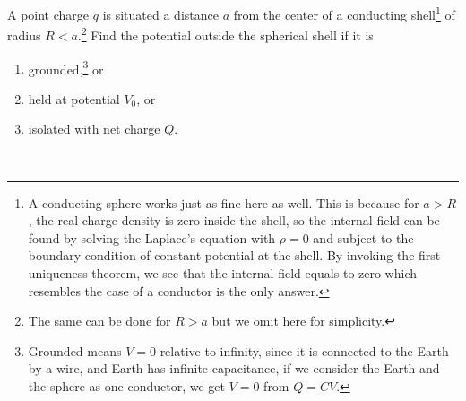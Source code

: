\documentclass[english,a4paper,12pt]{report}
\begin{document}
{A point charge \(q\) is situated a distance \(a\) from the center of a conducting shell\footnote{A conducting sphere works just as fine here as well. This is because for \(a > R\), the real charge density is zero inside the shell, so the internal field can be found by solving the Laplace's equation with \(\rho = 0\) and subject to the boundary condition of constant potential at the shell. By invoking the first uniqueness theorem, we see that the internal field equals to zero which resembles the case of a conductor is the only answer.} of radius \(R < a\).\footnote{The same can be done for \(R > a\) but we omit here for simplicity.} Find the potential outside the spherical shell if it is  
\newline 
\begin{enumerate}[itemsep=10pt] 
    \item grounded,\footnote{Grounded means \(V = 0 \) relative to infinity, since it is connected to the Earth by a wire, and Earth has infinite capacitance, if we consider the Earth and the sphere as one conductor, we get \(V = 0\) from \(Q = CV\).} or
    \item held at potential \(V_0\), or
    \item isolated with net charge \(Q\).
\end{enumerate}~}
\end{document}
